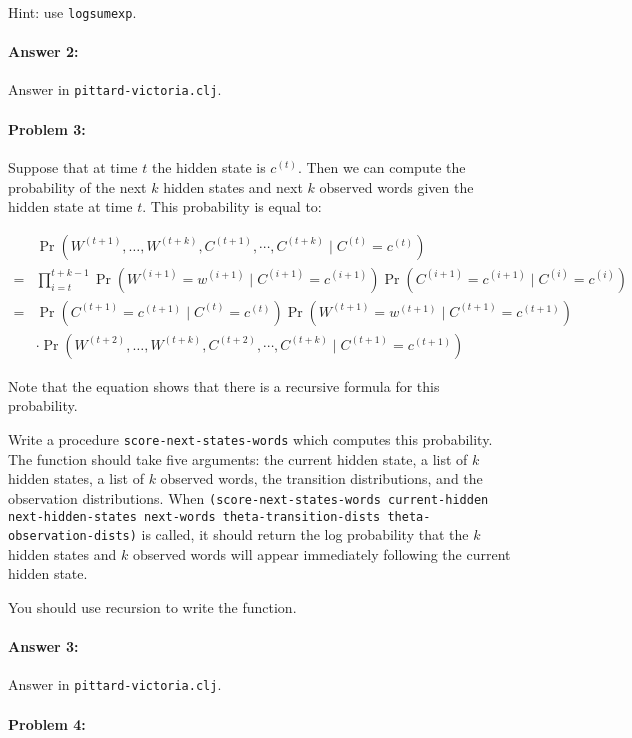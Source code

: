 \documentclass[10pt]{article}
\begin{document}
Hint: use \texttt{logsumexp}. 

\paragraph{Answer 2:} Answer in
\texttt{pittard-victoria.clj}.

\hrulefill
\paragraph{Problem 3:}
Suppose that at time $t$ the hidden state is $c^{(t)}$. Then we
can compute the probability of the next $k$ hidden states and next
$k$ observed words given the hidden state at time $t$. This
probability is equal to:

\begin{align}
&\Pr(W^{(t+1)},\dots,W^{(t+k)},C^{(t+1)},\cdots,C^{(t+k)} \mid C^{(t)}=c^{(t)} )\\
=&\prod_{i=t}^{t+k-1} \Pr(W^{(i+1)}=w^{(i+1)} \mid C^{(i+1)}=c^{(i+1)}) \Pr(C^{(i+1)} =c^{(i+1)}\mid C^{(i)}=c^{(i)}) \\
= & \Pr(C^{(t+1)} =c^{(t+1)}\mid C^{(t)}=c^{(t)}) \Pr(W^{(t+1)} =w^{(t+1)}\mid C^{(t+1)}=c^{(t+1)}) \\
&\cdot \Pr(W^{(t+2)},\dots,W^{(t+k)},C^{(t+2)},\cdots,C^{(t+k)} \mid C^{(t+1)}=c^{(t+1)} )
\end{align}

Note that the equation shows that there is a recursive formula for
this probability.

Write a procedure \texttt{score-next-states-words} which computes this
probability. The function should take five arguments: the current
hidden state, a list of $k$ hidden states, a list of $k$ observed
words, the transition distributions, and the observation
distributions. When \texttt{(score-next-states-words current-hidden
  next-hidden-states next-words theta-transition-dists
  theta-observation-dists)} is called, it should return the log
probability that the $k$ hidden states and $k$ observed words will
appear immediately following the current hidden state.

You should use recursion to write the function. 

\paragraph{Answer 3:} Answer in
\texttt{pittard-victoria.clj}.

\hrulefill
\paragraph{Problem 4:}
\end{document}
